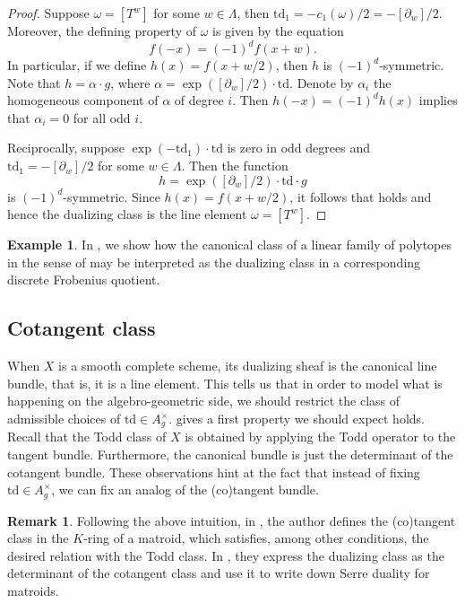 \documentclass[oneside]{amsart}
\theoremstyle{plain}
\theoremstyle{definition}
\newtheorem{remark}[theorem]{Remark}
\newtheorem{example}[theorem]{Example}
\newcommand{\td}{{\mathrm{td}}}
\begin{document}
\begin{proof}

Suppose $\omega = [T^w]$ for some $w \in \Lambda$,
then $\td_1 = -c_1(\omega)/2= -[\partial_w]/2$. Moreover, the defining property of $\omega$ is given by the equation
\begin{equation}\label{eq:serre-line-bundle}
f(-x) = (-1)^d f(x + w).
\end{equation}
In particular, if we define $h(x) = f(x + w/2)$, then $h$ is $(-1)^d$-symmetric. Note that $h = \alpha \cdot g$, where $\alpha = \exp([\partial_w]/2) \cdot \td$. Denote by $\alpha_i$ the homogeneous component of $\alpha$ of degree $i$. Then $h(-x) = (-1)^d h(x)$ implies that $\alpha_i = 0$ for all odd $i$.

Reciprocally, 
suppose $\exp(-\td_1) \cdot \td$ is zero in odd degrees and $\td_1 = -[\partial_w]/2$ for some $w\in \Lambda$.
Then the function 
\[ h = \exp([\partial_w]/2) \cdot \td \cdot g\]
is $(-1)^d$-symmetric.
Since $h(x) = f(x + w/2)$, it follows that  holds and
hence the dualizing class is the line element $\omega = [T^w]$.
\end{proof}

\begin{example}
    In , we show how the canonical class of a linear family of polytopes in the sense of \cite{kavvil} may be interpreted as the dualizing class in a corresponding discrete Frobenius quotient.
\end{example}

\subsection{Cotangent class}

When $X$ is a smooth complete scheme, its dualizing sheaf is the canonical line bundle, that is,
it is a line element.
This tells us that in order to model what is happening on the algebro-geometric side, we should restrict the class of admissible choices of $\td \in A_g^\times$.  gives a first property we should expect holds.
Recall that the Todd class of $X$ is obtained by applying the Todd operator to the tangent bundle. Furthermore, the canonical bundle is just the determinant of the cotangent bundle. These observations hint at the fact that instead of fixing $\td \in A_g^\times$, we can fix an analog of the (co)tangent bundle.

\begin{remark}
    Following the above intuition, in \cite[Theorem 1.1]{Cheng2025}, the author defines the (co)tangent class in the $K$-ring of a matroid, which satisfies, among other conditions, the desired relation with the Todd class. In \cite[Proposition 3.20]{Cheng2025}, they express the dualizing class as the determinant of the cotangent class and use it to write down Serre duality for matroids.
\end{remark}
\end{document}
